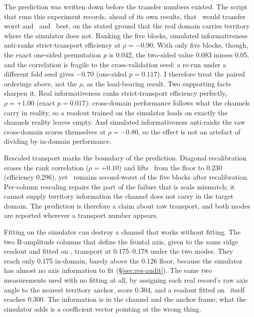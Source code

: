 The prediction was written down before the transfer numbers existed. The script that runs this experiment records, ahead of its own results, that \STblock\ would transfer worst and \Qblock\ and \Rblock\ best, on the stated ground that the real domain carries territory where the simulator does not. Ranking the five blocks, simulated informativeness anti-ranks strict-transport efficiency at $\rho=-0.90$. With only five blocks, though, the exact one-sided permutation $p$ is 0.042, the two-sided value 0.083 misses 0.05, and the correlation is fragile to the cross-validation seed: a re-run under a different fold seed gives $-0.70$ (one-sided $p=0.117$). I therefore treat the paired orderings above, not the $\rho$, as the load-bearing result. Two supporting facts sharpen it. Real informativeness ranks strict-transport efficiency perfectly, $\rho=+1.00$ (exact $p=0.017$): cross-domain performance follows what the channels carry in reality, so a readout trained on the simulator loads on exactly the channels reality leaves empty. And simulated informativeness anti-ranks the raw cross-domain scores themselves at $\rho=-0.80$, so the effect is not an artefact of dividing by in-domain performance. 

Rescaled transport marks the boundary of the prediction. Diagonal recalibration erases the rank correlation ($\rho=+0.10$) and lifts \STblock\ from the floor to 0.230 (efficiency 0.296), yet \STblock\ remains second-worst of the five blocks after recalibration. Per-column rescaling repairs the part of the failure that is scale mismatch; it cannot supply territory information the channel does not carry in the target domain. The prediction is therefore a claim about raw transport, and both modes are reported wherever a transport number appears.  

Fitting on the simulator can destroy a channel that works without fitting. The two R-amplitude columns that define the frontal axis, given to the same ridge readout and fitted on \medalcare, transport at 0.175--0.178 under the two modes. They reach only 0.175 in-domain, barely above the 0.126 floor, because the simulator has almost no axis information to fit (\S\ref{sec:res-audit}). The same two measurements used with no fitting at all, by assigning each real record's raw axis angle to the nearest territory anchor, score 0.304, and a readout fitted on \ptbxl\ itself reaches 0.300. The information is in the channel and the anchor frame; what the simulator adds is a coefficient vector pointing at the wrong thing. 

